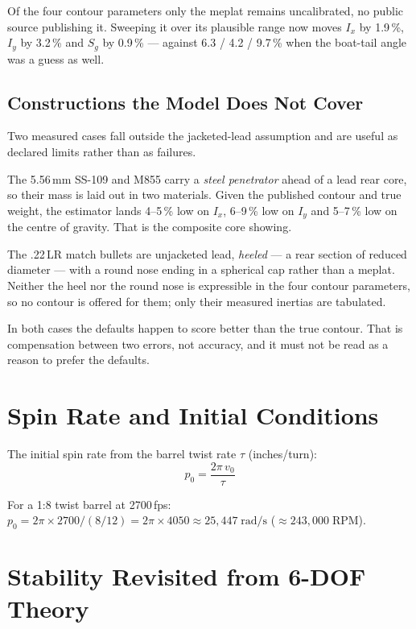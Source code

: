 \documentclass[11pt,twoside,openright]{report}
\begin{document}
Of the four contour parameters only the meplat remains uncalibrated, no public
source publishing it. Sweeping it over its plausible range now moves $I_x$ by
1.9\,\%, $I_y$ by 3.2\,\% and $S_g$ by 0.9\,\% --- against 6.3 / 4.2 / 9.7\,\% when
the boat-tail angle was a guess as well.

\subsection{Constructions the Model Does Not Cover}

Two measured cases fall outside the jacketed-lead assumption and are useful as
declared limits rather than as failures.

The 5.56\,mm SS-109 and M855 carry a \emph{steel penetrator} ahead of a lead rear
core, so their mass is laid out in two materials. Given the published contour and
true weight, the estimator lands 4--5\,\% low on $I_x$, 6--9\,\% low on $I_y$ and
5--7\,\% low on the centre of gravity. That is the composite core showing.

The .22\,LR match bullets are unjacketed lead, \emph{heeled} --- a rear section of
reduced diameter --- with a round nose ending in a spherical cap rather than a
meplat. Neither the heel nor the round nose is expressible in the four contour
parameters, so no contour is offered for them; only their measured inertias are
tabulated.

In both cases the defaults happen to score better than the true contour. That is
compensation between two errors, not accuracy, and it must not be read as a reason
to prefer the defaults.

\section{Spin Rate and Initial Conditions}

The initial spin rate from the barrel twist rate $\tau$ (inches/turn):
\begin{equation}
  p_0 = \frac{2\pi\,v_0}{\tau}
  \label{eq:initial_spin}
\end{equation}

For a 1:8 twist barrel at 2700\,fps: $p_0 = 2\pi \times 2700/(8/12) = 2\pi \times 4050 \approx 25{,}447\;\text{rad/s}$ ($\approx 243{,}000\;\text{RPM}$).

\section{Stability Revisited from 6-DOF Theory}
\label{sec:stability6dof}
\end{document}
